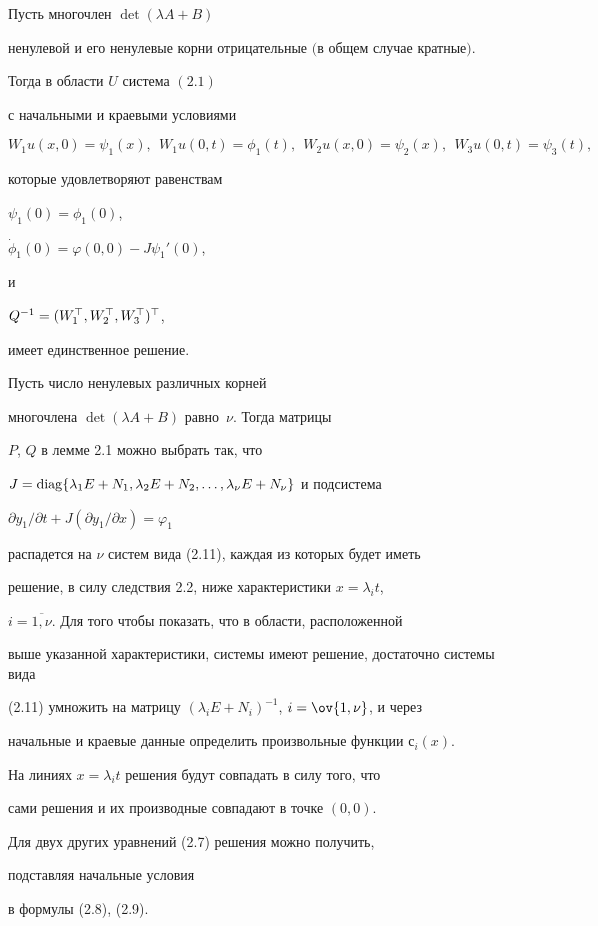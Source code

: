 \begin{thms}


Пусть многочлен $\det(\lambda A+B)$


ненулевой и его ненулевые корни отрицательные $($в общем случае кратные$)$.


Тогда в области $U$ система $(2.1)$


с начальными и краевыми условиями


$$


W_{1}u(x,0)=\psi_{1}(x),\ \ W_{1}u(0,t)=\phi _{1}(t),\ \


W_{2}u(x,0)=\psi _{2}(x),\ \ W_{3}u(0,t)=\psi_{3}(t),


$$


которые удовлетворяют равенствам


$\psi_{1}(0)=\phi_{1}(0)$,


$\Dot{\phi}_{1}(0)=\varphi(0,0)-J\psi_{1}'(0)$,


и


$Q^{-1}=\linebreak(W_{1}^{\top}, W_{2}^{\top }, W_{3}^{\top })^{\top }$,


имеет единственное решение.


\end{thms}





\begin{pf}


Пусть число ненулевых различных корней


многочлена $\det(\lambda A+B)$ равно~$\nu$. Тогда матрицы


$P$, $Q$ в лемме 2.1 можно выбрать так, что


$J=\diag \{\lambda_{1}E+N_{1},\lambda_{2}E+N_{2},


\dotsc, \lambda_{\nu}E+N_{\nu}\}$ и подсистема


$\partial y_1/\partial t+J(\partial y_1/\partial x)=\varphi _1$


распадется на $\nu$ систем вида (2.11), каждая из которых будет иметь 


решение, в силу следствия 2.2, ниже характеристики $x=\lambda_{i} t$, 


$i=\overline {1,\nu }$. Для того чтобы показать, что в области, расположенной 


выше указанной характеристики, системы имеют решение, достаточно системы вида 


(2.11) умножить на матрицу $(\lambda_{i}E+N_{i})^{-1}$, $i=\ov{1,\nu}$, и через


начальные и краевые данные определить произвольные функции $с_i(x)$. 


На линиях $x=\lambda_{i} t$ решения будут совпадать в силу того, что


сами решения и их производные совпадают в точке $(0,0)$.


Для двух других уравнений (2.7) решения можно получить,


подставляя начальные условия


в формулы (2.8), (2.9).


\end{pf}





